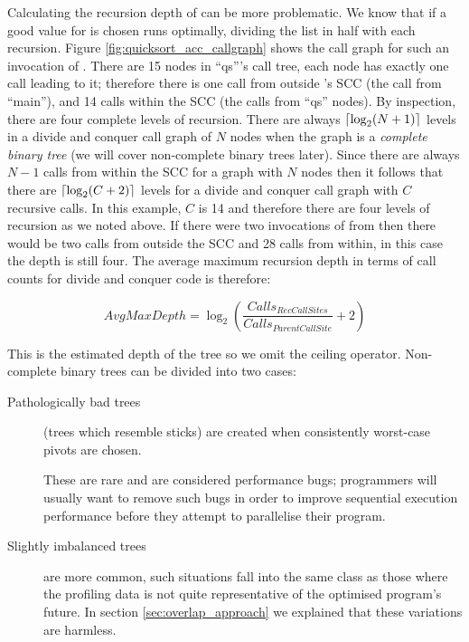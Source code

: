 Calculating the recursion depth of \quicksortacc can be more
problematic.
We know that if a good value for  is chosen \quicksortacc runs
optimally,
dividing the list in half with each recursion.
Figure \ref{fig:quicksort_acc_callgraph} shows the call graph for such an
invocation of \quicksortacc.
There are 15 nodes in ``qs'''s call tree,
each node has exactly one call leading to it;
therefore there is one call from outside \quicksortacc's SCC
(the call from ``main''),
and 14 calls within the SCC
(the calls from ``qs'' nodes).
By inspection, there are four complete levels of recursion.
There are always
$\lceil\log_2(N+1)\rceil$
levels in a divide and conquer call graph of $N$ nodes when
the graph is a \emph{complete binary tree}
(we will cover non-complete binary trees later).
Since there are always $N-1$ calls from within the SCC for a graph with
$N$ nodes then it follows that
there are $\lceil\log_2(C+2)\rceil$ levels for a divide and conquer call graph
with $C$ recursive calls.
In this example, $C$ is 14 and therefore there are four levels of recursion
as we noted above.
If there were two invocations of \quicksortacc from  then there
would be two calls from outside the SCC and 28 calls from within,
in this case the depth is still four.
The average maximum recursion depth in terms of call counts for divide and
conquer code is therefore:

\begin{equation*}
AvgMaxDepth = \log_2 
	\left(\frac{Calls_{RecCallSites}}{Calls_{ParentCallSite}} + 2\right)
\end{equation*}

\noindent
This is the estimated depth of the tree so we omit the ceiling operator.
Non-complete binary trees can be divided into two cases:

\begin{description}
    \item[Pathologically bad trees] (trees which resemble sticks)
    are created when consistently worst-case pivots are chosen.

    These are rare and are considered performance bugs;
    programmers will usually want to remove such bugs in order to improve
    sequential execution performance before they attempt to parallelise
    their program.

    \item[Slightly imbalanced trees] are more common,
    such situations fall into the same class as those where the profiling
    data is not quite representative of the optimised program's future.
    In section \ref{sec:overlap_approach} we explained that these variations
    are harmless.
\end{description}

